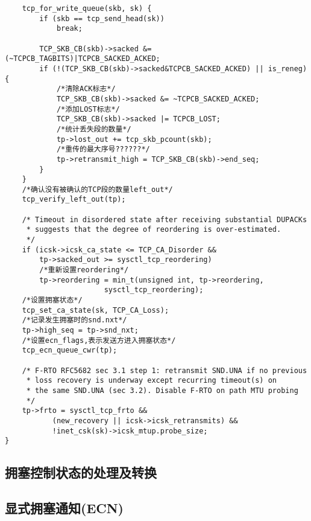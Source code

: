 \begin{verbatim}
	tcp_for_write_queue(skb, sk) {
		if (skb == tcp_send_head(sk))
			break;

		TCP_SKB_CB(skb)->sacked &= (~TCPCB_TAGBITS)|TCPCB_SACKED_ACKED;
		if (!(TCP_SKB_CB(skb)->sacked&TCPCB_SACKED_ACKED) || is_reneg) {
			/*清除ACK标志*/
			TCP_SKB_CB(skb)->sacked &= ~TCPCB_SACKED_ACKED;
			/*添加LOST标志*/			
			TCP_SKB_CB(skb)->sacked |= TCPCB_LOST;
			/*统计丢失段的数量*/			
			tp->lost_out += tcp_skb_pcount(skb);
			/*重传的最大序号??????*/
			tp->retransmit_high = TCP_SKB_CB(skb)->end_seq;
		}
	}
	/*确认没有被确认的TCP段的数量left_out*/
	tcp_verify_left_out(tp);

	/* Timeout in disordered state after receiving substantial DUPACKs
	 * suggests that the degree of reordering is over-estimated.
	 */
	if (icsk->icsk_ca_state <= TCP_CA_Disorder &&
	    tp->sacked_out >= sysctl_tcp_reordering)
		/*重新设置reordering*/
		tp->reordering = min_t(unsigned int, tp->reordering,
				       sysctl_tcp_reordering);
	/*设置拥塞状态*/	
	tcp_set_ca_state(sk, TCP_CA_Loss);
	/*记录发生拥塞时的snd.nxt*/
	tp->high_seq = tp->snd_nxt;
	/*设置ecn_flags,表示发送方进入拥塞状态*/	
	tcp_ecn_queue_cwr(tp);

	/* F-RTO RFC5682 sec 3.1 step 1: retransmit SND.UNA if no previous
	 * loss recovery is underway except recurring timeout(s) on
	 * the same SND.UNA (sec 3.2). Disable F-RTO on path MTU probing
	 */
	tp->frto = sysctl_tcp_frto &&
		   (new_recovery || icsk->icsk_retransmits) &&
		   !inet_csk(sk)->icsk_mtup.probe_size;
}
\end{verbatim}
	\subsection{拥塞控制状态的处理及转换}

	\subsection{显式拥塞通知(ECN)}


